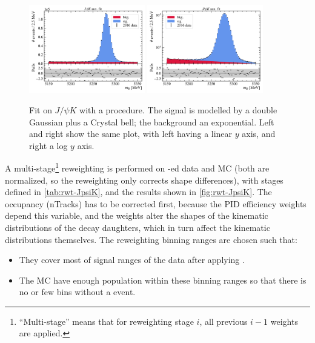 \begin{figure}[htb]
    \centering
    \includegraphics[width=0.45\textwidth]{./figs-mc-correction/reweighting-JpsiK/fit-JpsiK/fit_final.pdf}
    \hspace{1em}
    \includegraphics[width=0.45\textwidth]{./figs-mc-correction/reweighting-JpsiK/fit-JpsiK/fit_final_log_scale.pdf}

    \caption{
        Fit on $J/\psi K$ with a \sPlot procedure.
        The signal is modelled by a double Gaussian plus a Crystal bell;
        the background an exponential.
        Left and right show the same plot, with left having a linear $y$ axis,
        and right a log $y$ axis.
    }
    \label{fig:fit-JpsiK-data}
\end{figure}

A multi-stage\footnote{
    ``Multi-stage'' means that for reweighting stage $i$,
    all previous $i-1$ weights are applied.
} reweighting is performed on \sWeight-ed data and MC
(both are normalized, so the reweighting only corrects shape differences),
with stages defined in \cref{tab:rwt-JpsiK},
and the results shown in \cref{fig:rwt-JpsiK}.
The occupancy (nTracks) has to be corrected first,
because the PID efficiency weights depend this variable, and the weights alter
the shapes of the kinematic distributions of the \B decay daughters, which in
turn affect the \B kinematic distributions themselves.
The reweighting binning ranges are chosen such that:
\begin{itemize}
    \item They cover most of signal ranges of the data after applying \sWeight.
    \item The MC have enough population within these binning
        ranges so that there is no or few bins without a event.
\end{itemize}

